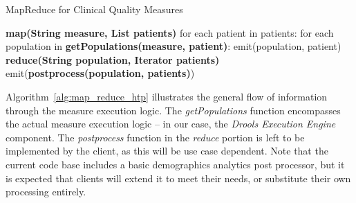 \documentclass{amia}
\begin{document}
\begin{algorithm}[H]
\caption{MapReduce for Clinical Quality Measures}
\label{alg:map_reduce_htp}
\begin{algorithmic}[1]
\State \textbf{map(String measure, List patients)}
\State \hspace{\algorithmicindent} for each patient in patients:
\State \hspace{\algorithmicindent} \hspace{\algorithmicindent} for each population in \textbf{getPopulations(measure, patient)}:
\State \hspace{\algorithmicindent} \hspace{\algorithmicindent} \hspace{\algorithmicindent} emit(population, patient)
\State \textbf{reduce(String population, Iterator patients)}
\State \hspace{\algorithmicindent} emit(\textbf{postprocess(population, patients)})
\end{algorithmic}
\end{algorithm}

Algorithm~\ref{alg:map_reduce_htp} illustrates the general flow of information through the measure execution logic. The \textit{getPopulations} function encompasses the actual measure execution logic -- in our case, the \textit{Drools Execution Engine} component. The \textit{postprocess} function in the \textit{reduce} portion is left to be implemented by the client, as this will be use case dependent. Note that the current code base includes a basic demographics analytics post processor, but it is expected that clients will extend it to meet their needs, or substitute their own processing entirely.

\end{document}

